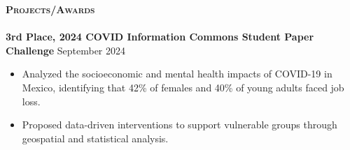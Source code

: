 \documentclass[a4paper]{article}
\newcommand{\lineunder} {
    \vspace*{-8pt} \\
    \hspace*{-18pt} \hrulefill \\
}
\newcommand{\header} [1] {
    {\hspace*{-18pt}\vspace*{6pt} \textsc{#1}}
    \vspace*{-6pt} \lineunder
}
\begin{document}

\vspace*{1mm}

\header{\textbf{Projects/Awards}}

\textbf{3rd Place, 2024 COVID Information Commons Student Paper Challenge} \hfill September 2024 \\
    \begin{itemize}[noitemsep]
        \item Analyzed the socioeconomic and mental health impacts of COVID-19 in Mexico, identifying that 42\% of females and 40\% of young adults faced job loss.
        \item Proposed data-driven interventions to support vulnerable groups through geospatial and statistical analysis.
    \end{itemize}
\end{document}
